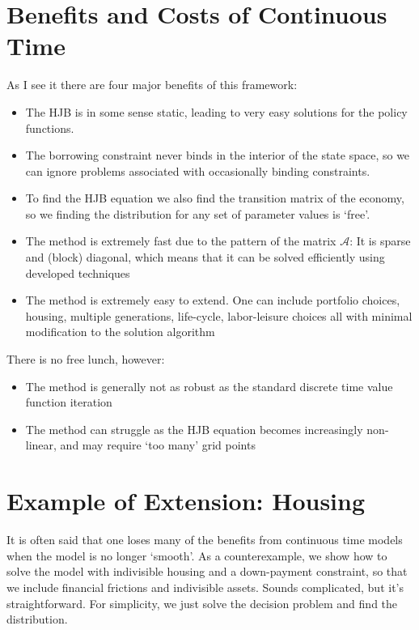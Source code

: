 \documentclass[12pt]{article}
\DeclareMathOperator{\1}{\mathbbm{1}}
\begin{document}
\section{Benefits and Costs of Continuous Time}
As I see it there are four major benefits of this framework:
\begin{itemize}
\item The HJB is in some sense static, leading to very easy solutions for the policy functions.
\item The borrowing constraint never binds in the interior of the state space, so we can ignore problems associated with occasionally binding constraints.
\item To find the HJB equation we also find the transition matrix of the economy, so we finding the distribution for any set of parameter values is `free'.
\item The method is extremely fast due to the pattern of the matrix $\mathcal{A}$: It is sparse and (block) diagonal, which means that it can be solved efficiently using developed techniques
\item The method is extremely easy to extend. One can include portfolio choices, housing, multiple generations, life-cycle, labor-leisure choices all with minimal modification to the solution algorithm
\end{itemize}

There is no free lunch, however:
\begin{itemize}
\item The method is generally not as robust as the standard discrete time value function iteration
\item The method can struggle as the HJB equation becomes increasingly non-linear, and may require `too many' grid points
\end{itemize}

\section{Example of Extension: Housing}
It is often said that one loses many of the benefits from continuous time models when the model is no longer `smooth'. As a counterexample, we show how to solve the model with indivisible housing and a down-payment constraint, so that we include financial frictions and indivisible assets. Sounds complicated, but it's straightforward. For simplicity, we just solve the decision problem and find the distribution.
\end{document}

